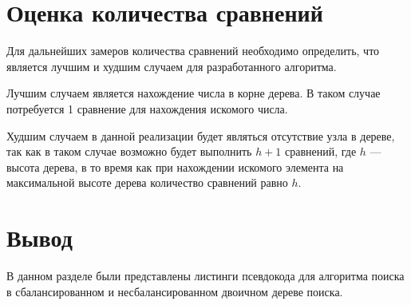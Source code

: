 \section{Оценка количества сравнений}
Для дальнейших замеров количества сравнений необходимо определить, что является лучшим и худшим случаем для разработанного алгоритма.

Лучшим случаем является нахождение числа в корне дерева.
В таком случае потребуется 1 сравнение для нахождения искомого числа.

Худшим случаем в данной реализации будет являться отсутствие узла в дереве, так как в таком случае возможно будет выполнить $h + 1$ сравнений, где $h$ --- высота дерева, в то время как при нахождении искомого элемента на максимальной высоте дерева количество сравнений равно $h$.

\section*{Вывод}

В данном разделе были представлены листинги псевдокода для алгоритма поиска в сбалансированном и несбалансированном двоичном дереве поиска.
